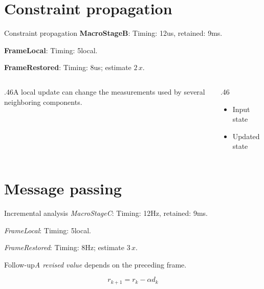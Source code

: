 \documentclass[10pt,aspectratio=43]{beamer}
\newcommand{\fuzzlayerA}[1]{\textbf{#1}}
\newcommand{\fuzzterm}[1]{\fuzzlayerA{#1}}
\newcommand{\fuzzpair}[2]{\fuzzterm{#1}: #2}
\newcommand{\fuzzunit}{ms}
\let\fuzzoriginalunit\fuzzunit
\newcommand{\fuzzcoefficient}{1}
\newcommand{\fuzzscale}[2][\fuzzcoefficient]{#1\,#2}
\begin{document}
\renewcommand{\fuzzunit}{us}
\renewcommand{\fuzzcoefficient}{2}
\renewcommand{\fuzzterm}[1]{{\textbf{#1}}}
\section{Constraint propagation}
\begin{frame}[t]{Constraint propagation}
\fuzzpair{MacroStageB}{Timing: 12\fuzzunit, retained: 9\fuzzoriginalunit.}\par
{\renewcommand{\fuzzunit}{local}\fuzzpair{FrameLocal}{Timing: 5\fuzzunit.}\par}
\fuzzpair{FrameRestored}{Timing: 8\fuzzunit; estimate $\fuzzscale{x}$.}\par
\begin{columns}[T]\begin{column}{.46\textwidth}A local update can change the measurements used by several neighboring components.\end{column}\begin{column}{.46\textwidth}\begin{itemize}\item Input state\item Updated state\end{itemize}\end{column}\end{columns}
\end{frame}
\renewcommand{\fuzzunit}{Hz}
\renewcommand{\fuzzcoefficient}{3}
\renewcommand{\fuzzterm}[1]{{\textit{#1}}}
\section{Message passing}
\begin{frame}[t]{Incremental analysis}
\fuzzpair{MacroStageC}{Timing: 12\fuzzunit, retained: 9\fuzzoriginalunit.}\par
{\renewcommand{\fuzzunit}{local}\fuzzpair{FrameLocal}{Timing: 5\fuzzunit.}\par}
\fuzzpair{FrameRestored}{Timing: 8\fuzzunit; estimate $\fuzzscale{x}$.}\par
\begin{block}{Follow-up}\fuzzterm{A revised value} depends on the preceding frame.\end{block}
\[r_{k+1}=r_k-\alpha d_k\]
\end{frame}
\end{document}
